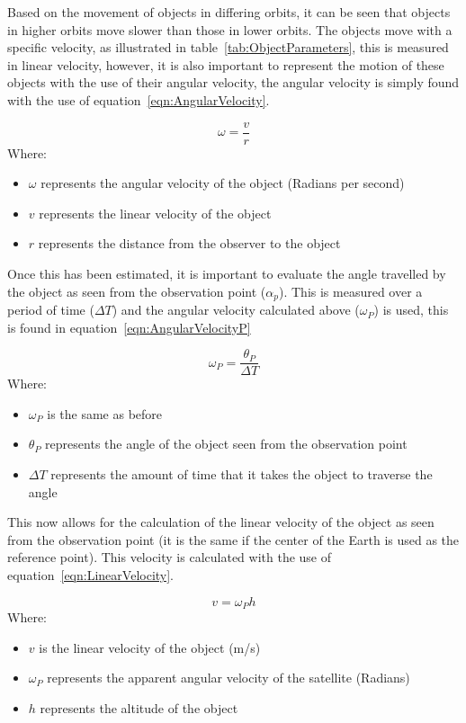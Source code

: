 \documentclass[11pt]{witseiepaper}
\begin{document}
Based on the movement of objects in differing orbits, it can be seen that objects in higher orbits move slower than those in lower orbits.
The objects move with a specific velocity, as illustrated in table~\ref{tab:ObjectParameters}, this is measured in linear velocity, however, it is also important to represent the motion of these objects with the use of their angular velocity, the angular velocity is simply found with the use of equation~\ref{eqn:AngularVelocity}.

\begin{equation} \label{eqn:AngularVelocity}
\omega = \frac{v}{r}
\end{equation}
Where:
\begin{itemize}
    \item $\omega$ represents the angular velocity of the object (Radians per second)
    \item $v$ represents the linear velocity of the object
    \item $r$ represents the distance from the observer to the object
\end{itemize}


Once this has been estimated, it is important to evaluate the angle travelled by the object as seen from the observation point ($\alpha_{p}$). This is measured over a period of time ($\Delta T$) and the angular velocity calculated above ($\omega_{P}$) is used, this is found in equation~\ref{eqn:AngularVelocityP}

\begin{equation} \label{eqn:AngularVelocityP}
    \omega_{P} = \frac{\theta_{P}}{\Delta T}
\end{equation}
Where:
\begin{itemize}
    \item $\omega_{P}$ is the same as before
    \item $\theta_{P}$ represents the angle of the object seen from the observation point
    \item $\Delta T$ represents the amount of time that it takes the object to traverse the angle
\end{itemize}

This now allows for the calculation of the linear velocity of the object as seen from the observation point (it is the same if the center of the Earth is used as the reference point). This velocity is calculated with the use of equation~\ref{eqn:LinearVelocity}.

\begin{equation} \label{eqn:LinearVelocity}
    v = \omega_{P} h
\end{equation}
Where:
\begin{itemize}
    \item $v$ is the linear velocity of the object (m/s)
    \item $\omega_{P}$ represents the apparent angular velocity of the satellite (Radians)
    \item $h$ represents the altitude of the object
\end{itemize}
\end{document}
